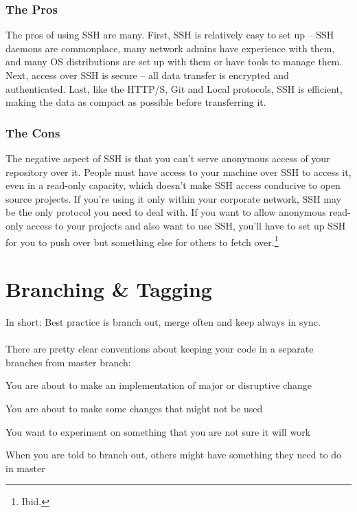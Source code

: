 \documentclass[12pt,letterpaper,dvips]{article}
\newenvironment{enumerate*}%
  {\begin{enumerate}%
    \setlength{\itemsep}{0pt}%
    \setlength{\parsep}{0pt}}%
  {\end{enumerate}}
\begin{document}
\subsubsection{The Pros}
The pros of using SSH are many.  First, SSH is relatively easy
to set up – SSH daemons are commonplace, many network admins have
experience with them, and many OS distributions are set up with
them or have tools to manage them.  Next, access over SSH is
secure – all data transfer is encrypted and authenticated.  Last,
like the HTTP/S, Git and Local protocols, SSH is efficient, making
the data as compact as possible before transferring it.


\subsubsection{The Cons}
The negative aspect of SSH is that you can’t serve anonymous
access of your repository over it.  People must have access to
your machine over SSH to access it, even in a read-only capacity,
which doesn’t make SSH access conducive to open source projects.
If you’re using it only within your corporate network, SSH may be
the only protocol you need to deal with.  If you want to allow
anonymous read-only access to your projects and also want to use
SSH, you’ll have to set up SSH for you to push over but something
else for others to fetch over.\footnote{Ibid.}


\newpage
\section{Branching \& Tagging}

In short: Best practice is branch out, merge often and keep
always in sync.\\
\\
\noindent There are pretty clear conventions about keeping your
code in a separate branches from master branch:

\begin{enumerate*}
\item You are about to make an implementation of major or
disruptive change
\item You are about to make some changes that might not be used
\item You want to experiment on something that you are not sure
    it will work
\item When you are told to branch out, others might have
    something they need to do in master
\end{enumerate*}
\end{document}
